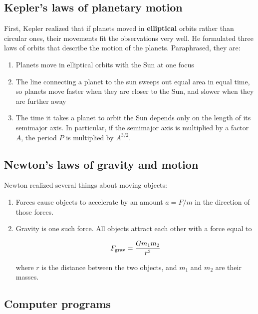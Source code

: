 \documentclass[11pt]{article}
\begin{document}
\newpage

\subsection{Kepler's laws of planetary motion}

First, Kepler realized that if planets moved in {\bf elliptical} orbits rather than circular ones, their movements fit the observations very well. He formulated three laws of orbits that describe the motion of the planets. Paraphrased, they are:

\begin{enumerate}

\item Planets move in elliptical orbits with the Sun at one focus
  
\item The line connecting a planet to the sun sweeps out equal area in equal time, so planets move faster when they are closer to the Sun, and slower when they are further away

\item  The time it takes a planet to orbit the Sun depends only on the length of its semimajor axis. In particular, if the semimajor axis is multiplied by a factor $A$, the period $P$ is multiplied by $A^{3/2}.$

\end{enumerate}


\subsection{Newton's laws of gravity and motion}

Newton realized several things about moving objects:

\begin{enumerate}
	\item Forces cause objects to accelerate by an amount $a = F/m$ in the direction of those forces.
	\item Gravity is one such force. All objects attract each other with a force equal to
	
	$$ F_{\rm grav} = \frac{Gm_1m_2}{r^2} $$
	
	where $r$ is the distance between the two objects, and $m_1$ and $m_2$ are their masses.
\end{enumerate}

\subsection{Computer programs}
\end{document}
